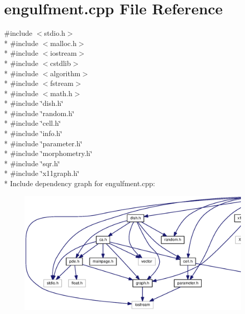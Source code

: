 \section{engulfment.\-cpp File Reference}
\label{engulfment_8cpp}
{\ttfamily \#include $<$stdio.\-h$>$}\\*
{\ttfamily \#include $<$malloc.\-h$>$}\\*
{\ttfamily \#include $<$iostream$>$}\\*
{\ttfamily \#include $<$cstdlib$>$}\\*
{\ttfamily \#include $<$algorithm$>$}\\*
{\ttfamily \#include $<$fstream$>$}\\*
{\ttfamily \#include $<$math.\-h$>$}\\*
{\ttfamily \#include \char`\"{}dish.\-h\char`\"{}}\\*
{\ttfamily \#include \char`\"{}random.\-h\char`\"{}}\\*
{\ttfamily \#include \char`\"{}cell.\-h\char`\"{}}\\*
{\ttfamily \#include \char`\"{}info.\-h\char`\"{}}\\*
{\ttfamily \#include \char`\"{}parameter.\-h\char`\"{}}\\*
{\ttfamily \#include \char`\"{}morphometry.\-h\char`\"{}}\\*
{\ttfamily \#include \char`\"{}sqr.\-h\char`\"{}}\\*
{\ttfamily \#include \char`\"{}x11graph.\-h\char`\"{}}\\*
Include dependency graph for engulfment.\-cpp\-:
\nopagebreak
\begin{figure}[H]
\begin{center}
\leavevmode
\includegraphics[width=350pt]{engulfment_8cpp__incl}
\end{center}
\end{figure}
